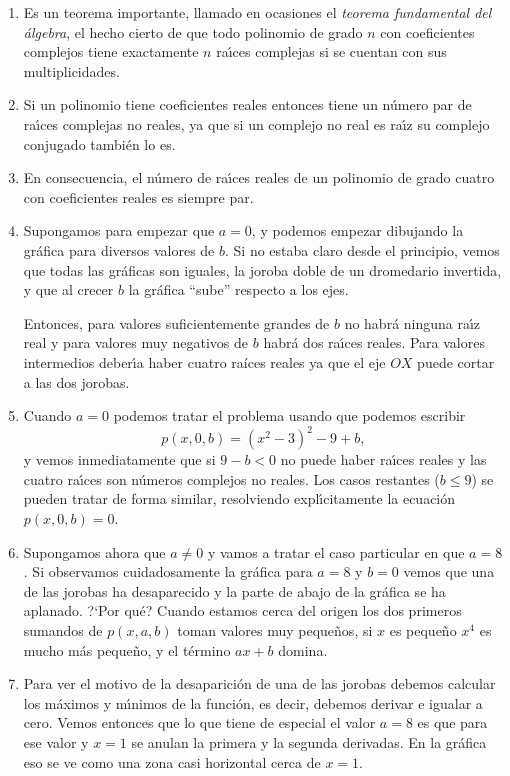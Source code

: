 \begin{enumerate}
 \item Es un teorema importante, llamado en ocasiones el {\itshape teorema
fundamental del \'algebra}, el hecho cierto de que todo polinomio de grado $n$
con coeficientes complejos tiene exactamente $n$ ra\'{\i}ces complejas si se
cuentan con sus multiplicidades.
\item Si un polinomio tiene coeficientes reales entonces tiene un n\'umero par
de ra\'{\i}ces complejas no reales, ya que si un complejo no real es
ra\'{\i}z su complejo conjugado tambi\'en lo es. 
\item En consecuencia, el n\'umero de ra\'{\i}ces reales de un polinomio de
grado cuatro con coeficientes reales es siempre par.

\item Supongamos para empezar que $a=0$, y podemos empezar dibujando la
gr\'afica para diversos valores de $b$. Si no estaba claro desde el principio,
vemos que todas las gr\'aficas son iguales, la joroba doble de un dromedario
invertida, y que al crecer $b$ la gr\'afica ``sube'' respecto a los ejes.

Entonces, para valores suficientemente grandes de $b$ no habr\'a ninguna
ra\'{\i}z real y para valores muy negativos de $b$ habr\'a dos ra\'{\i}ces
reales. Para valores intermedios deber\'{\i}a haber cuatro ra\'ices reales ya
que el eje $OX$ puede cortar a las dos jorobas. 
 
 \item Cuando $a=0$ podemos tratar el problema usando que podemos escribir
 \[p(x,0,b)=(x^2-3)^2-9+b,\]
 \noindent y vemos inmediatamente que si $9-b<0$ no puede haber ra\'{\i}ces
reales y las cuatro ra\'{\i}ces son n\'umeros complejos no reales. Los casos
restantes ($b\le 9$) se pueden tratar de forma similar, resolviendo
expl\'{\i}citamente la ecuaci\'on $p(x,0,b)=0$.

\item Supongamos ahora que $a\ne 0$ y vamos a tratar el caso particular en que
$a=8$. Si observamos cuidadosamente la gr\'afica para $a=8$ y $b=0$ vemos que
una de las jorobas ha desaparecido y la parte de abajo de la gr\'afica se ha
aplanado. ?`Por qu\'e? Cuando estamos cerca del origen  los dos primeros
sumandos de  $p(x,a,b)$ toman valores muy peque\~nos, si $x$ es peque\~no $x^4$
es mucho m\'as peque\~no, y el t\'ermino $ax+b$ domina. 

\item Para ver el motivo de la desaparici\'on de una de las jorobas debemos
calcular los m\'aximos y m\'{\i}nimos de la funci\'on, es decir, debemos derivar
e igualar a cero. Vemos entonces que lo que tiene de especial el valor $a=8$ es
que para ese valor y $x=1$ se anulan la primera y la segunda derivadas. En la
gr\'afica eso se ve como una zona casi horizontal cerca de $x=1$.


\end{enumerate}
